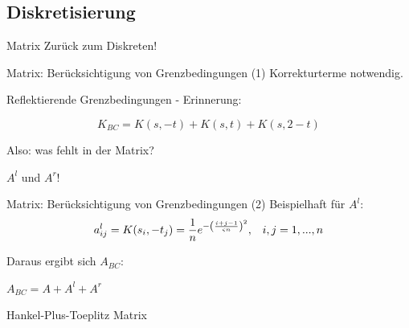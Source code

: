 \documentclass[11pt]{beamer}
\begin{document}
\subsection{Diskretisierung}
\begin{frame}{Matrix}
Zurück zum Diskreten!
\end{frame}


\begin{frame}{Matrix: Berücksichtigung von Grenzbedingungen (1)}
Korrekturterme notwendig.

Reflektierende Grenzbedingungen - Erinnerung:

\[K_{BC} = K(s, -t) + K(s,  t) + K(s, 2-t)\]

Also: was fehlt in der Matrix?
\pause

$A^l$ und $A^r$!
\end{frame}


\begin{frame}{Matrix: Berücksichtigung von Grenzbedingungen (2)}
Beispielhaft für $A^l$:
\[
a^l_{ij} = K(s_i, -t_j) = \frac{1}{n} e^{-\left(i+j-1 \over \varsigma n\right)^2}, \,\,\,\,\, i,j = 1, ..., n
\]

Daraus ergibt sich $A_{BC}$:

\begin{center}
$A_{BC} = A + A^l + A^r$ 
\end{center}
\end{frame}


\begin{frame}
\begin{center}
Hankel-Plus-Toeplitz Matrix
\end{center}
\end{frame}
\end{document}
